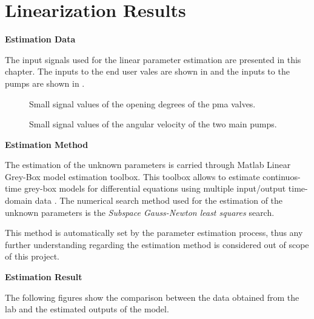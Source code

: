 \chapter{Linearization Results}
\label{LinResults}
\textbf{Estimation Data}

The input signals used for the linear parameter estimation are presented in this chapter.  
The inputs to the end user vales are shown in  and the inputs to the pumps are shown in . 


\begin{figure}[H]
  \centering
  \begin{minipage}[b]{0.45\textwidth}
     
    \caption{Small signal values of the opening degrees of the pma valves. }
    \label{fig:est_OD_data}
  \end{minipage}
  \hfill
  \begin{minipage}[b]{0.45\textwidth}
     
    \caption{Small signal values of the angular velocity of the two main pumps.}
    \label{fig:est_deltap_data}
  \end{minipage}
\end{figure}

\textbf{Estimation Method}

The estimation of the unknown parameters is carried through Matlab Linear Grey-Box model estimation toolbox. This toolbox allows to estimate continuos-time 
grey-box models for differential equations using multiple input/output time-domain data \cite{LinearEstimation}.
The numerical search method used for the estimation of the unknown parameters is the \textit{Subspace Gauss-Newton least squares} search. 

This method is automatically set by the parameter estimation process, thus any further understanding regarding the estimation method is considered out of 
scope of this project. 


\textbf{Estimation Result}

 

The following figures show the comparison between the data obtained from the lab and the estimated outputs of the model.  

